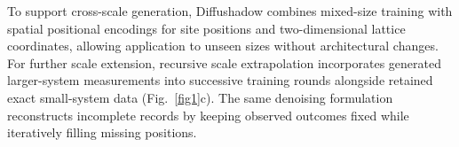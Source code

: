\documentclass[pdflatex,sn-nature]{sn-jnl}%
\theoremstyle{thmstyleone}%
\theoremstyle{thmstyletwo}%
\theoremstyle{thmstylethree}%
\begin{document}
To support cross-scale generation, Diffushadow combines mixed-size training with spatial positional encodings for site positions and two-dimensional lattice coordinates, allowing application to unseen sizes without architectural changes. For further scale extension, recursive scale extrapolation incorporates generated larger-system measurements into successive training rounds alongside retained exact small-system data (Fig.~\ref{fig1}c). 
The same denoising formulation reconstructs incomplete records by keeping observed outcomes fixed while iteratively filling missing positions.








\end{document}
